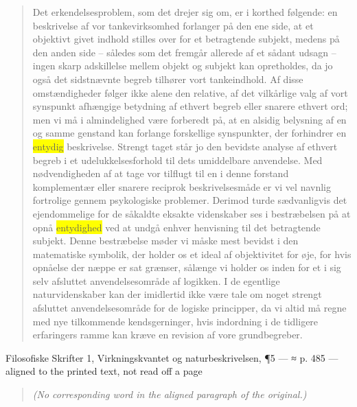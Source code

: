 \documentclass[11pt]{article}
\newcommand{\dcite}[1]{{\nopagebreak\raggedleft\small #1\par}\medskip}
\newcommand{\tlg}[1]{{\setlength{\fboxsep}{0.8pt}\colorbox{yellow}{#1}}}
\begin{document}
\begin{quote}
Det erkendelsesproblem, som det drejer sig om, er i korthed følgende: en beskrivelse af vor tankevirksomhed forlanger på den ene side, at et objektivt givet indhold stilles over for et betragtende subjekt, medens på den anden side – således som det fremgår allerede af et sådant udsagn – ingen skarp adskillelse mellem objekt og subjekt kan opretholdes, da jo også det sidstnævnte begreb tilhører vort tankeindhold. Af disse omstændigheder følger ikke alene den relative, af det vilkårlige valg af vort synspunkt afhængige betydning af ethvert begreb eller snarere ethvert ord; men vi må i almindelighed være forberedt på, at en alsidig belysning af en og samme genstand kan forlange forskellige synspunkter, der forhindrer en \tlg{entydig} beskrivelse. Strengt taget står jo den bevidste analyse af ethvert begreb i et udelukkelsesforhold til dets umiddelbare anvendelse. Med nødvendigheden af at tage vor tilflugt til en i denne forstand komplementær eller snarere reciprok beskrivelsesmåde er vi vel navnlig fortrolige gennem psykologiske problemer. Derimod turde sædvanligvis det ejendommelige for de såkaldte eksakte videnskaber ses i bestræbelsen på at opnå \tlg{entydighed} ved at undgå enhver henvisning til det betragtende subjekt. Denne bestræbelse møder vi måske mest bevidst i den matematiske symbolik, der holder os et ideal af objektivitet for øje, for hvis opnåelse der næppe er sat grænser, sålænge vi holder os inden for et i sig selv afsluttet anvendelsesområde af logikken. I de egentlige naturvidenskaber kan der imidlertid ikke være tale om noget strengt afsluttet anvendelsesområde for de logiske principper, da vi altid må regne med nye tilkommende kendsgerninger, hvis indordning i de tidligere erfaringers ramme kan kræve en revision af vore grundbegreber.
\end{quote}
\dcite{Filosofiske Skrifter 1, Virkningskvantet og naturbeskrivelsen, ¶5 — ≈ p. 485 — aligned to the printed text, not read off a page}
{\footnotesize\begin{quote}\itshape (No corresponding word in the aligned paragraph of the original.)\end{quote}}
\end{document}
